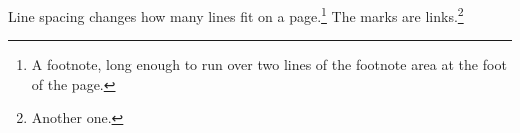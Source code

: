 \documentclass{article}
\begin{document}
Line spacing changes how many lines fit on a page.\footnote{A footnote, long enough to run over two lines of the footnote area at the foot of the page.} The marks are links.\footnote{Another one.}
\end{document}
